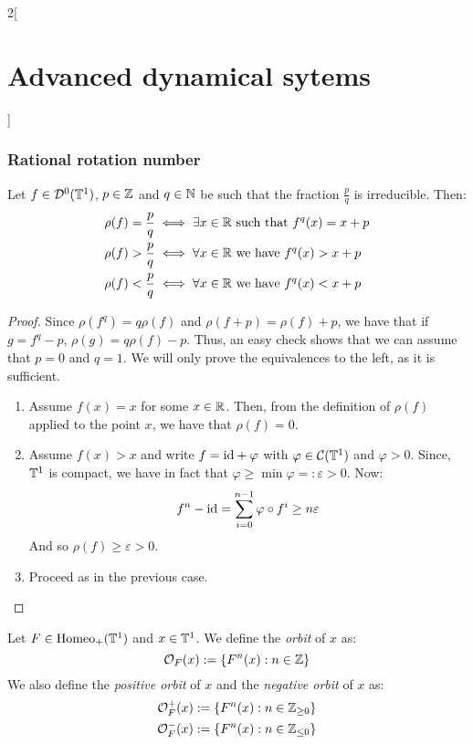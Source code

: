 \documentclass[../../../main_math.tex]{subfiles}
\begin{document}
\begin{multicols}{2}[\section{Advanced dynamical sytems}]
  \subsubsection{Rational rotation number}
  \begin{proposition}\label{ADS:characterisation_rot_number}
    Let $f\in \mathcal{D}^0(\mathbb{T}^1)$, $p\in\mathbb{Z}$ and $q\in\mathbb{N}$ be such that the fraction $\frac{p}{q}$ is irreducible. Then:
    \begin{align*}
      \rho(f)=\frac{p}{q} & \iff \exists x\in\mathbb{R}\text{ such that }f^q(x)=x+p \\
      \rho(f)>\frac{p}{q} & \iff \forall x\in\mathbb{R}\text{ we have }f^q(x)>x+p   \\
      \rho(f)<\frac{p}{q} & \iff \forall x\in\mathbb{R}\text{ we have }f^q(x)<x+p
    \end{align*}
  \end{proposition}
  \begin{proof}
    Since $\rho(f^q)= q\rho(f)$ and $\rho(f+p)=\rho(f)+p$, we have that if $g=f^q-p$, $\rho(g)=q \rho(f)-p$. Thus, an easy check shows that we can assume that $p=0$ and $q=1$. We will only prove the equivalences to the left, as it is sufficient.
    \begin{enumerate}
      \item Assume $f(x)=x$ for some $x\in\mathbb{R}$. Then, from the definition of $\rho(f)$ applied to the point $x$, we have that $\rho(f)=0$.
      \item Assume $f(x)>x$ and write $f=\mathrm{id}+\varphi$ with $\varphi\in\mathcal{C}(\mathbb{T}^1)$ and $\varphi>0$. Since, $\mathbb{T}^1$ is compact, we have in fact that $\varphi\geq \min\varphi=:\varepsilon>0$. Now:
            $$
              f^n-\mathrm{id} = \sum_{i=0}^{n-1}\varphi\circ f^i\geq n\varepsilon
            $$
            And so $\rho(f)\geq \varepsilon>0$.
      \item Proceed as in the previous case.
    \end{enumerate}
  \end{proof}
  \begin{definition}
    Let $F\in\mathrm{Homeo}_+(\mathbb{T}^1)$ and $x\in \mathbb{T}^1$. We define the \emph{orbit} of $x$ as:
    $$
      \mathcal{O}_F(x):=\{F^n(x):n\in\mathbb{Z}\}
    $$
    We also define the \emph{positive orbit} of $x$  and the \emph{negative orbit} of $x$ as:
    \begin{align*}
      \mathcal{O}_F^+(x) & :=\{F^n(x):n\in\mathbb{Z}_{\geq 0}\} \\
      \mathcal{O}_F^-(x) & :=\{F^n(x):n\in\mathbb{Z}_{\leq 0}\}
    \end{align*}

\end{definition}
\end{multicols}
\end{document}
